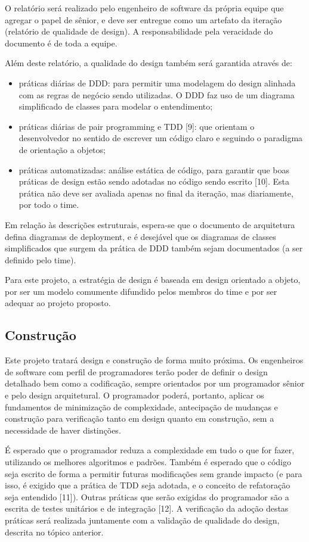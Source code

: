 \documentclass[12pt,journal,compsoc]{IEEEtran}
\begin{document}
O relatório será realizado pelo engenheiro de software da própria equipe que agregar o papel de sênior, e deve ser entregue como um artefato da iteração (relatório de qualidade de design). A responsabilidade pela veracidade do documento é de toda a equipe.

Além deste relatório, a qualidade do design também será garantida através de:
\begin{itemize}
\item práticas diárias de DDD: para permitir uma modelagem do design alinhada com as regras de negócio sendo utilizadas. O DDD faz uso de um diagrama simplificado de classes para modelar o entendimento;
\item práticas diárias de pair programming e TDD [9]: que orientam o desenvolvedor no sentido de escrever um código claro e seguindo o paradigma de orientação a objetos;
\item práticas automatizadas: análise estática de código, para garantir que boas práticas de design estão sendo adotadas no código sendo escrito [10]. Esta prática não deve ser avaliada apenas no final da iteração, mas diariamente, por todo o time.
\end{itemize}

Em relação às descrições estruturais, espera-se que o documento de arquitetura defina diagramas de deployment, e é desejável que os diagramas de classes simplificados que surgem da prática de DDD também sejam documentados (a ser definido pelo time).

Para este projeto, a estratégia de design é baseada em design orientado a objeto, por ser um modelo comumente difundido pelos membros do time e por ser adequar ao projeto proposto.


\subsection{Construção}

Este projeto tratará design e construção de forma muito próxima. Os engenheiros de software com perfil de programadores terão poder de definir o design detalhado bem como a codificação, sempre orientados por um programador sênior e pelo design arquitetural. O programador poderá, portanto, aplicar os fundamentos de minimização de complexidade, antecipação de mudanças e construção para verificação tanto em design quanto em construção, sem a necessidade de haver distinções.

É esperado que o programador reduza a complexidade em tudo o que for fazer, utilizando os melhores algoritmos e padrões. Também é esperado que o código seja escrito de forma a permitir futuras modificações sem grande impacto (e para isso, é exigido que a prática de TDD seja adotada, e o conceito de refatoração seja entendido [11]). Outras práticas que serão exigidas do programador são a escrita de testes unitários e de integração [12]. A verificação da adoção destas práticas será realizada juntamente com a validação de qualidade do design, descrita no tópico anterior. 
\end{document}
